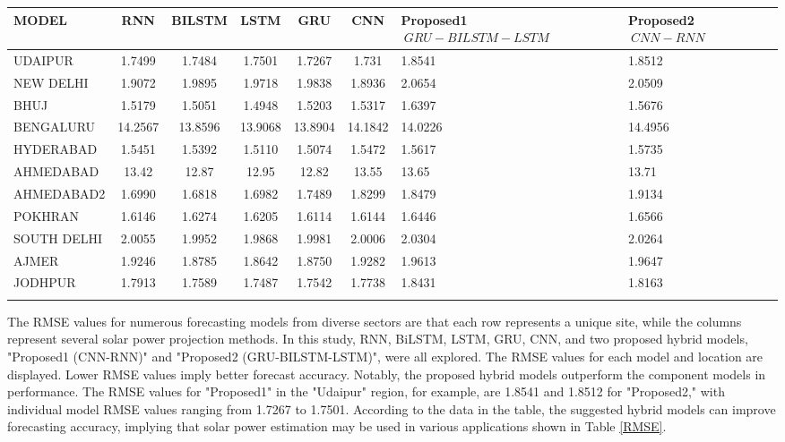   \begin{table*}[!ht]
  \centering
  \setlength{\tabcolsep}{3pt}
  {\renewcommand{\arraystretch}{1}%
  \caption{RMSE performances of proposed models  and traditional models}
  \begin{tabular}{|l|c|c|c|c|c|p{}|p{}|}
  \hline
  \textbf{MODEL} & \textbf{RNN} & \textbf{BILSTM} & \textbf{LSTM} & \textbf{GRU} & \textbf{CNN} &\textbf{Proposed1 \(\ GRU-BILSTM-LSTM \)\ } & \textbf{Proposed2 \(\ CNN-RNN\)\ } \\ \hline
  UDAIPUR & 1.7499 & 1.7484 & 1.7501 & 1.7267 & 1.731 & 1.8541 & 1.8512 \\ \hline
  NEW DELHI & 1.9072 & 1.9895 & 1.9718 & 1.9838 & 1.8936 & 2.0654 & 2.0509 \\ \hline
  BHUJ & 1.5179 & 1.5051 & 1.4948 & 1.5203 & 1.5317 & 1.6397 & 1.5676 \\ \hline
  BENGALURU & 14.2567 & 13.8596 & 13.9068 & 13.8904 & 14.1842 & 14.0226 & 14.4956 \\ \hline
  HYDERABAD & 1.5451 & 1.5392 & 1.5110 & 1.5074 & 1.5472 & 1.5617 & 1.5735 \\ \hline
  AHMEDABAD & 13.42 & 12.87 & 12.95 & 12.82 & 13.55 & 13.65 & 13.71 \\ \hline
  AHMEDABAD2 & 1.6990 & 1.6818 & 1.6982 & 1.7489 & 1.8299 & 1.8479 & 1.9134 \\ \hline
  POKHRAN & 1.6146 & 1.6274 & 1.6205 & 1.6114 & 1.6144 & 1.6446 & 1.6566 \\ \hline
  SOUTH DELHI & 2.0055 & 1.9952 & 1.9868 & 1.9981 & 2.0006 & 2.0304 & 2.0264 \\ \hline
  AJMER & 1.9246 & 1.8785 & 1.8642 & 1.8750 & 1.9282 & 1.9613 & 1.9647 \\ \hline
  JODHPUR & 1.7913 & 1.7589 & 1.7487 & 1.7542 & 1.7738 & 1.8431 & 1.8163 \\ \hline
  \label{RMSE}
  \end{tabular}%
  }
  \end{table*}
  
  The RMSE values for numerous forecasting models from diverse sectors are that each row represents a unique site, while the columns represent several solar power projection methods. In this study, RNN, BiLSTM, LSTM, GRU, CNN, and two proposed hybrid models, "Proposed1 (CNN-RNN)" and "Proposed2 (GRU-BILSTM-LSTM)", were all explored. The RMSE values for each model and location are displayed. Lower RMSE values imply better forecast accuracy. Notably, the proposed hybrid models outperform the component models in performance. The RMSE values for "Proposed1" in the "Udaipur" region, for example, are 1.8541 and 1.8512 for "Proposed2," with individual model RMSE values ranging from 1.7267 to 1.7501. According to the data in the table, the suggested hybrid models can improve forecasting accuracy, implying that solar power estimation may be used in various applications shown in Table \ref{RMSE}.
  
